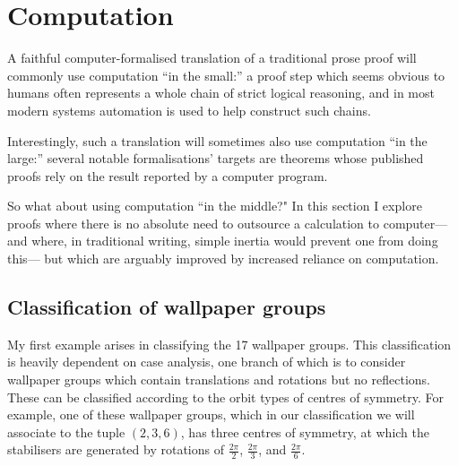 \documentclass[12pt]{llncs}
\begin{document}
\section{Computation} \label{sec:computation}

A faithful computer-formalised translation of a traditional prose proof will commonly use computation
``in the small:''
a proof step which seems obvious to humans
often represents a whole chain of strict logical reasoning,
and in most modern systems automation is used to help construct such chains.

Interestingly, such a translation will sometimes also use computation ``in the large:''
several notable formalisations' \cite{Gon08Notices,Hal17,Imm2018}
targets are
theorems whose published proofs rely on the result reported by a computer program.

So what about using computation ``in the middle?"
In this section I explore proofs where there is no absolute need to outsource a calculation to computer---%
and where, in traditional writing, simple inertia would prevent one from doing this---%
but which are arguably improved by increased reliance on computation.


\subsection{Classification of wallpaper groups} \label{sec:wallpaper}

My first example 
arises in classifying the 17 wallpaper groups.
This classification is heavily dependent on case analysis,
one branch of which is to consider wallpaper groups which contain translations and
rotations but no reflections.
These can be classified according to the orbit types of centres of symmetry.
For example, one of these wallpaper groups,
which in our classification we will associate to the tuple $(2,3,6)$,
has three centres of symmetry,
at which the stabilisers are generated by rotations of
$\frac{2\pi}{2}$,
$\frac{2\pi}{3}$,
and $\frac{2\pi}{6}$.
\end{document}
